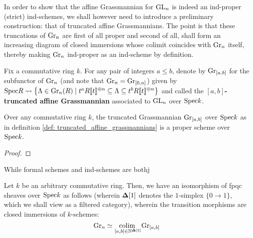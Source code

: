             In order to show that the affine Grassmannian for $\operatorname{GL}_n$ is indeed an ind-proper (strict) ind-schemes, we shall however need to introduce a preliminary construction: that of truncated affine Grassmannians. The point is that these truncations of $\mathrm{Gr}_n$ are first of all proper and second of all, shall form an increasing diagram of closed immersions whose colimit coincides with $\mathrm{Gr}_n$ itself, thereby making $\mathrm{Gr}_n$ ind-proper as an ind-scheme by definition.
            \begin{definition} \label{def: truncated_affine_grassmannians}
                Fix a commutative ring $k$. For any pair of integers $a \leq b$, denote by $\mathrm{Gr}_{[a, b]}$ for the subfunctor of $\mathrm{Gr}_n$ (and note that $\mathrm{Gr}_n = \mathrm{Gr}_{[0, n]}$) given by $\mathrm{Spec} R \leadsto \left\{ \Lambda \in \mathrm{Gr}_n(R) \mid t^a R[\![t]\!]^{\oplus n} \subseteq \Lambda \subseteq t^b R[\![t]\!]^{\oplus n} \right\}$ and called the \textbf{$[a, b]$-truncated affine Grassmannian} associated to $\operatorname{GL}_n$ over $\mathrm{Spec} k$.
            \end{definition}
            \begin{proposition} \label{prop: truncated_grassmannians_are_proper}
                Over any commutative ring $k$, the truncated Grassmannian $\mathrm{Gr}_{[a, b]}$ over $\mathrm{Spec} k$ as in definition \ref{def: truncated_affine_grassmannians} is a proper scheme over $\mathrm{Spec} k$.
            \end{proposition}
                \begin{proof}
                    
                \end{proof}
            \begin{remark} \label{remark: ind_schemes_and_formal_schemes}
                While formal schemes and ind-schemes are bothj 
            \end{remark}
            \begin{proposition} \label{prop: the_colimit_over_truncated_grassmannians}
                Let $k$ be an arbitrary commutative ring. Then, we have an isomorphism of fpqc sheaves over $\mathrm{Spec} k$ as follows (wherein $\mathbf{\Delta}[1]$ denotes the $1$-simplex $\{0 \to 1\}$, which we shall view as a filtered category), wherein the transition morphisms are closed immersions of $k$-schemes:
                    $$\mathrm{Gr}_n \simeq \underset{ [a, b] \in \mathbb{N}^{\mathbf{\Delta}[1]} }{\operatorname{colim} \:} \mathrm{Gr}_{[a, b]}$$
            \end{proposition}
